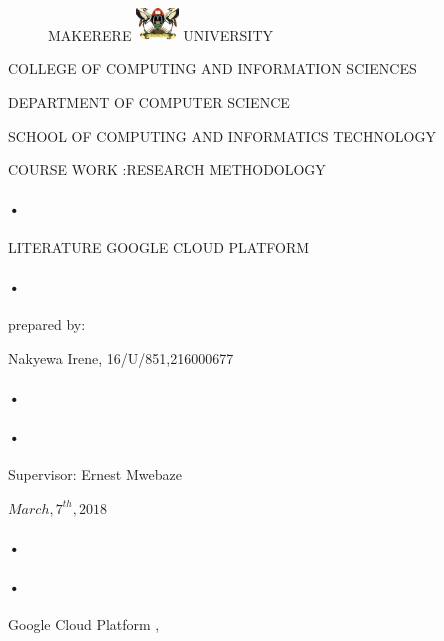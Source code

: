 \documentclass[10pt,]{article}
\begin{document}
\begin{titlepage}
\begin{figure}[h]
  \centerline{\small MAKERERE 
  \includegraphics[width=0.1\textwidth]  {muk_log} UNIVERSITY}
\end{figure}
\centerline{COLLEGE OF COMPUTING AND INFORMATION SCIENCES\\}
\centerline{DEPARTMENT OF COMPUTER SCIENCE\\}
\centerline{SCHOOL OF COMPUTING AND INFORMATICS TECHNOLOGY\\}
\centerline{COURSE WORK :RESEARCH METHODOLOGY\\}
\paragraph*{•}
\centerline{LITERATURE GOOGLE CLOUD PLATFORM\\}
\paragraph*{•}
\centerline{prepared by:\\}
\centerline{Nakyewa Irene, 16/U/851,216000677\\}
\paragraph*{•}


\paragraph*{•}
\centerline{Supervisor: Ernest Mwebaze\\}
\centerline{ $March,7^{th},2018$\\}


\paragraph*{•}
\paragraph*{•}
  \begin{flushright}
 Google Cloud Platform ,\\
 
 \tableofcontents

  \end{flushright}
\date{\today}
\end{titlepage}
\end{document}
